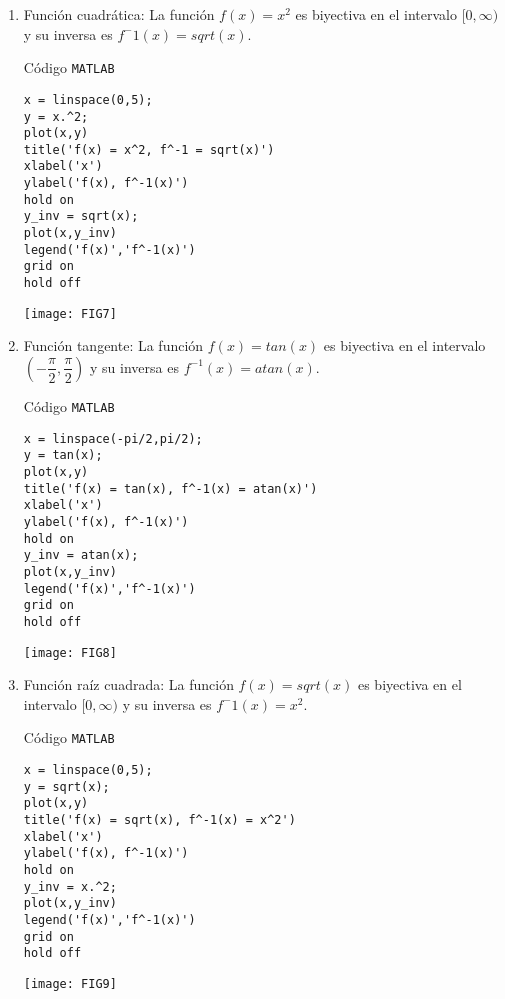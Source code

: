\documentclass[a4paper,12pt]{article}
\begin{document}
\begin{enumerate}
	\centering
	\item Función cuadrática: La función $f(x) = x^2$ es biyectiva en el intervalo $[0, \infty)$ y su inversa es 
	$f^-1(x) = sqrt(x)$.

	\vspace{1.5cm}
		\begin{multicols}{2}
		Código \texttt{MATLAB}
		\begin{lstlisting}[style=Matlab-editor]
x = linspace(0,5);
y = x.^2;
plot(x,y)
title('f(x) = x^2, f^-1 = sqrt(x)')
xlabel('x')
ylabel('f(x), f^-1(x)')
hold on
y_inv = sqrt(x);
plot(x,y_inv)
legend('f(x)','f^-1(x)')
grid on
hold off
		\end{lstlisting}
		\columnbreak
			\texttt{[image: FIG7]}
		\end{multicols}
	
	\item  Función tangente: La función $f(x) = tan(x)$ es biyectiva en el intervalo $(-\dfrac{\pi}{2}, \dfrac{\pi}{2})$ y su inversa es $f^{-1}(x) = atan(x)$.
	 \vspace{1.5cm}
		\begin{multicols}{2}
		Código \texttt{MATLAB}
		\begin{lstlisting}[style=Matlab-editor]
x = linspace(-pi/2,pi/2);
y = tan(x);
plot(x,y)
title('f(x) = tan(x), f^-1(x) = atan(x)')
xlabel('x')
ylabel('f(x), f^-1(x)')
hold on
y_inv = atan(x);
plot(x,y_inv)
legend('f(x)','f^-1(x)')
grid on
hold off
		\end{lstlisting}
		\columnbreak
			\texttt{[image: FIG8]}
		\end{multicols}

		\item Función raíz cuadrada: La función $f(x) = sqrt(x)$ es biyectiva en el intervalo $[0, \infty)$ y su inversa es $f^-1(x) = x^2$.
		 \vspace{1cm}
		\begin{multicols}{2}
		Código \texttt{MATLAB}
		\begin{lstlisting}[style=Matlab-editor]
x = linspace(0,5);
y = sqrt(x);
plot(x,y)
title('f(x) = sqrt(x), f^-1(x) = x^2')
xlabel('x')
ylabel('f(x), f^-1(x)')
hold on
y_inv = x.^2;
plot(x,y_inv)
legend('f(x)','f^-1(x)')
grid on
hold off
		\end{lstlisting}
		\columnbreak
			\texttt{[image: FIG9]}
		\end{multicols}

\end{enumerate}
\end{document}
